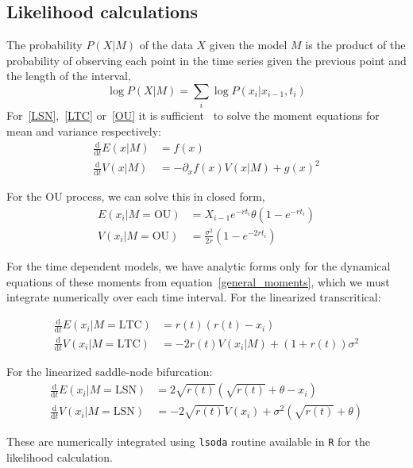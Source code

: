 \documentclass[authoryear,preprint,11pt]{elsarticle}
\newcommand{\ud}{\mathrm{d}}
\begin{document}
\subsection{Likelihood calculations}\label{likelihood}
The probability $P(X|M)$ of the data $X$ given the model $M$ is the product of the probability of observing each point in the time series given the previous point and the length of the interval,  
\begin{equation}
\log P(X | M)=  \sum_i \log P(x_i | x_{i-1}, t_i)
\end{equation}
For~\eqref{LSN},~\eqref{LTC} or~\eqref{OU} it is sufficient~\citep{Gardiner2009} to solve the moment equations for mean and variance respectively:
\begin{align}
 \frac{\ud }{\ud t} E(x| M)&=  f(x) \\
\frac{\ud}{\ud t} V(x| M) &=  -\partial_x f(x) V(x|M) + g(x)^2 
  \label{general_moments}
\end{align}

For the OU process, we can solve this in closed form, 
\begin{align}
  E(x_i| M = \text{OU}) &= X_{i-1} e^{-r t_i} \theta \left(1 - e^{-rt_i} \right) \\
V(x_i| M = \text{OU}) &= \frac{\sigma^2}{2 r} \left(1 - e^{-2 r t_i} \right)
\label{OUsoln}
\end{align}

For the time dependent models, we have analytic forms only for the dynamical equations of these moments from equation~\eqref{general_moments}, which we must integrate numerically over each time interval. For the linearized transcritical:

\begin{align}
\frac{\ud }{\ud t} E(x_i| M = \text{LTC})&=  r(t)(r(t) - x_i) \\
\frac{\ud}{\ud t} V(x_i| M = \text{LTC}) &=  -2 r(t) V(x_i|M) + (1+r(t))\sigma^2 
\label{LTCsoln}
\end{align}

For the linearized saddle-node bifurcation:
\begin{align}
\frac{\ud }{\ud t} E(x_i| M = \text{LSN})&=  2\sqrt{r(t)}(\sqrt{r(t)}+\theta - x_i) \\
\frac{\ud}{\ud t} V(x_i| M = \text{LSN}) &=  -2 \sqrt{r(t)} V(x_i) + \sigma^2 ( \sqrt{r(t)}+\theta )
\label{LSNsoln}
\end{align}

These are numerically integrated using \texttt{lsoda} routine available in \texttt{R} for the likelihood calculation.  
\end{document}
